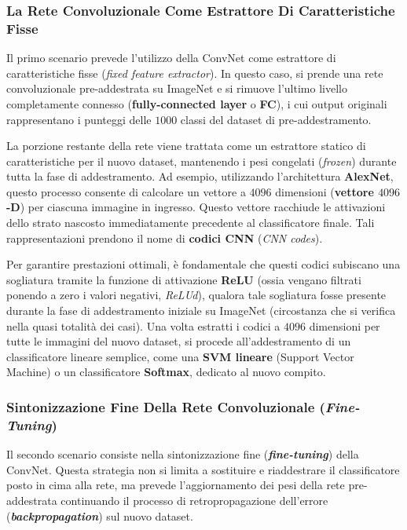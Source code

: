 ﻿\documentclass[11pt, a4paper]{article}
\begin{document}
\subsubsection{La Rete Convoluzionale Come Estrattore Di Caratteristiche Fisse}
Il primo scenario prevede l'utilizzo della ConvNet come estrattore di caratteristiche fisse (\emph{fixed feature extractor}). In questo caso, si prende una rete convoluzionale pre-addestrata su ImageNet e si rimuove l'ultimo livello completamente connesso (\textbf{fully-connected layer} o \textbf{FC}), i cui output originali rappresentano i punteggi delle $1000$ classi del dataset di pre-addestramento.

La porzione restante della rete viene trattata come un estrattore statico di caratteristiche per il nuovo dataset, mantenendo i pesi congelati (\emph{frozen}) durante tutta la fase di addestramento. Ad esempio, utilizzando l'architettura \textbf{AlexNet}, questo processo consente di calcolare un vettore a $4096$ dimensioni (\textbf{vettore $4096$-D}) per ciascuna immagine in ingresso. Questo vettore racchiude le attivazioni dello strato nascosto immediatamente precedente al classificatore finale. Tali rappresentazioni prendono il nome di \textbf{codici CNN} (\emph{CNN codes}).

Per garantire prestazioni ottimali, è fondamentale che questi codici subiscano una sogliatura tramite la funzione di attivazione \textbf{ReLU} (ossia vengano filtrati ponendo a zero i valori negativi, \emph{ReLUd}), qualora tale sogliatura fosse presente durante la fase di addestramento iniziale su ImageNet (circostanza che si verifica nella quasi totalità dei casi). Una volta estratti i codici a $4096$ dimensioni per tutte le immagini del nuovo dataset, si procede all'addestramento di un classificatore lineare semplice, come una \textbf{SVM lineare} (Support Vector Machine) o un classificatore \textbf{Softmax}, dedicato al nuovo compito.


\subsubsection{Sintonizzazione Fine Della Rete Convoluzionale (\emph{Fine-Tuning})}
Il secondo scenario consiste nella sintonizzazione fine (\textbf{\emph{fine-tuning}}) della ConvNet. Questa strategia non si limita a sostituire e riaddestrare il classificatore posto in cima alla rete, ma prevede l'aggiornamento dei pesi della rete pre-addestrata continuando il processo di retropropagazione dell'errore (\textbf{\emph{backpropagation}}) sul nuovo dataset.
\end{document}
